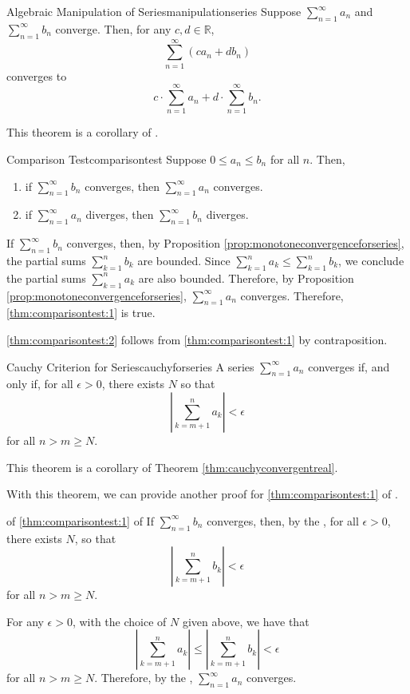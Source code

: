 
\begin{thm}{Algebraic Manipulation of Series}{manipulationseries}
	Suppose \(\sum_{n=1}^\infty a_n\) and \(\sum_{n=1}^\infty b_n\) converge. Then, for any \(c, d \in \mathbb{R}\), \[
		\sum_{n = 1}^\infty (ca_n + db_n)
	\]
	converges to \[
		c\cdot \sum_{n=1}^\infty a_n + d\cdot \sum_{n=1}^\infty b_n.
	\]
\end{thm}

This theorem is a corollary of . 

\begin{thm}{Comparison Test}{comparisontest}
	Suppose \(0 \leq a_n \leq b_n\) for all \(n\). Then,
	\begin{enumerate}
		\item if \(\sum_{n=1}^\infty b_n\) converges, then \(\sum_{n=1}^\infty a_n\) converges. \label{thm:comparisontest:1}
		\item if \(\sum_{n=1}^\infty a_n\) diverges, then \(\sum_{n=1}^\infty b_n\) diverges. \label{thm:comparisontest:2}
	\end{enumerate}
\end{thm}

\begin{dem}{}{}
	If \(\sum_{n = 1}^\infty b_n\) converges, then, by Proposition \ref{prop:monotoneconvergenceforseries}, the partial sums \(\sum_{k=1}^n b_k\) are bounded.  Since \(\sum_{k=1}^n a_k \leq \sum_{k=1}^n b_k\), we conclude the partial sums  \(\sum_{k=1}^n a_k\) are also bounded. Therefore, by Proposition \ref{prop:monotoneconvergenceforseries}, \(\sum_{n = 1}^\infty a_n\) converges. Therefore, \ref{thm:comparisontest:1} is true.

	\ref{thm:comparisontest:2} follows from \ref{thm:comparisontest:1} by contraposition.
\end{dem}

\begin{thm}{Cauchy Criterion for Series}{cauchyforseries}
	A series \(\sum_{n=1}^\infty a_n\) converges if, and only if, for all \(\epsilon > 0\), there exists \(N\) so that \[
		\left|\sum_{k=m+1}^n a_k\right| < \epsilon
	\]
	for all \(n > m \geq N\).
\end{thm}

This theorem is a corollary of Theorem \ref{thm:cauchyconvergentreal}.

With this theorem, we can provide another proof for \ref{thm:comparisontest:1} of .

\begin{dem}{of \ref{thm:comparisontest:1} of }{}
	If \(\sum_{n = 1}^\infty b_n\) converges, then, by the , for all \(\epsilon > 0\), there exists \(N\), so that \[
		\left|\sum_{k=m+1}^n b_k\right| < \epsilon
	\] for all \(n > m \geq N\).

	For any \(\epsilon > 0\), with the choice of \(N\) given above, we have that  \[
		\left|\sum_{k=m+1}^n a_k\right| \leq
		\left|\sum_{k=m+1}^n b_k\right| < \epsilon
	\] for all \(n > m \geq N\). Therefore, by the , \(\sum_{n=1}^\infty a_n\) converges.
\end{dem}
